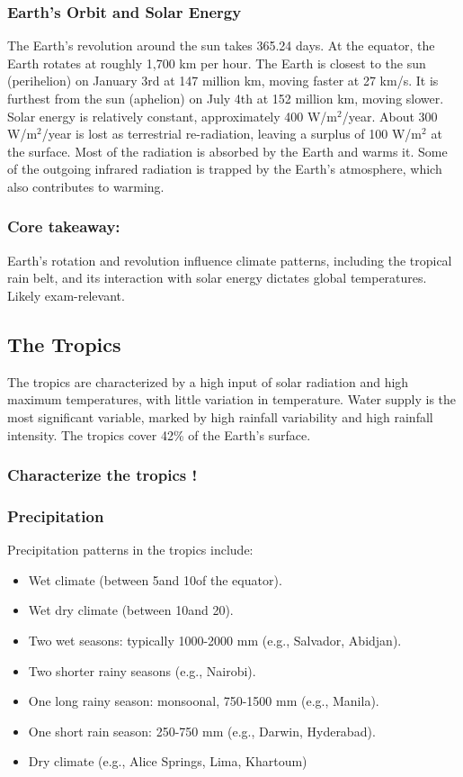 \subsubsection*{Earth's Orbit and Solar Energy} The Earth's revolution around the sun takes 365.24 days. At the equator, the Earth rotates at roughly 1,700 km per hour. The Earth is closest to the sun (perihelion) on January 3rd at 147 million km, moving faster at 27 km/s. It is furthest from the sun (aphelion) on July 4th at 152 million km, moving slower. Solar energy is relatively constant, approximately 400 W/m$^2$/year. About 300 W/m$^2$/year is lost as terrestrial re-radiation, leaving a surplus of 100 W/m$^2$ at the surface. Most of the radiation is absorbed by the Earth and warms it. Some of the outgoing infrared radiation is trapped by the Earth’s atmosphere, which also contributes to warming.

\subsubsection*{Core takeaway: }
Earth's rotation and revolution influence climate patterns, including the tropical rain belt, and its interaction with solar energy dictates global temperatures. Likely exam-relevant. 


\subsection{The Tropics} 
The tropics are characterized by a high input of solar radiation and high maximum temperatures, with little variation in temperature. Water supply is the most significant variable, marked by high rainfall variability and high rainfall intensity. The tropics cover 42\% of the Earth's surface. 
\subsubsection*{Characterize the tropics !} 
\subsubsection*{Precipitation} 
Precipitation patterns in the tropics include: 
\begin{itemize} 
    \item Wet climate (between 5\textdegree and 10\textdegree of the equator). 
    \item Wet dry climate (between 10\textdegree and 20\textdegree). 
    \item Two wet seasons: typically 1000-2000 mm (e.g., Salvador, Abidjan). 
    \item Two shorter rainy seasons (e.g., Nairobi). 
    \item One long rainy season: monsoonal, 750-1500 mm (e.g., Manila). 
    \item One short rain season: 250-750 mm (e.g., Darwin, Hyderabad). 
    \item Dry climate (e.g., Alice Springs, Lima, Khartoum)
\end{itemize}


